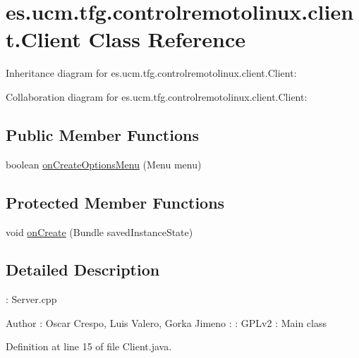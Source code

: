 \hypertarget{classes_1_1ucm_1_1tfg_1_1controlremotolinux_1_1client_1_1Client}{\section{es.\-ucm.\-tfg.\-controlremotolinux.\-client.\-Client Class Reference}
\label{classes_1_1ucm_1_1tfg_1_1controlremotolinux_1_1client_1_1Client}
}


Inheritance diagram for es.\-ucm.\-tfg.\-controlremotolinux.\-client.\-Client\-:


Collaboration diagram for es.\-ucm.\-tfg.\-controlremotolinux.\-client.\-Client\-:
\subsection*{Public Member Functions}
\begin{DoxyCompactItemize}
\item 
boolean \hyperlink{classes_1_1ucm_1_1tfg_1_1controlremotolinux_1_1client_1_1Client_a064b07f52eb031b77a36b0e96f55261f}{on\-Create\-Options\-Menu} (Menu menu)
\end{DoxyCompactItemize}
\subsection*{Protected Member Functions}
\begin{DoxyCompactItemize}
\item 
void \hyperlink{classes_1_1ucm_1_1tfg_1_1controlremotolinux_1_1client_1_1Client_a2548cbd2496a55b976b054d22f5f3f65}{on\-Create} (Bundle saved\-Instance\-State)
\end{DoxyCompactItemize}


\subsection{Detailed Description}
\-: Server.\-cpp \begin{DoxyAuthor}{Author}
\-: Oscar Crespo, Luis Valero, Gorka Jimeno  \-:  \-: G\-P\-Lv2  \-: Main class 
\end{DoxyAuthor}


Definition at line 15 of file Client.\-java.



